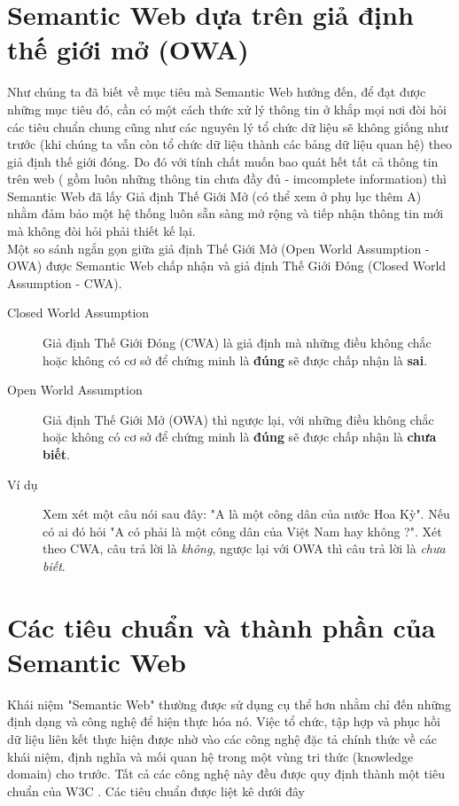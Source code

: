\section{Semantic Web dựa trên giả định thế giới mở (OWA)} 
Như chúng ta đã biết về mục tiêu mà Semantic Web hướng đến, để đạt được những mục tiêu đó, cần có một cách thức xử lý thông tin ở khắp mọi nơi đòi hỏi các tiêu chuẩn chung cũng như các nguyên lý tổ chức dữ liệu sẽ không giống như trước (khi chúng ta vẫn còn tổ chức dữ liệu thành các bảng dữ liệu quan hệ) theo giả định thế giới đóng. Do đó với tính chất muốn bao quát hết tất cả thông tin trên web ( gồm luôn những thông tin chưa đầy đủ - imcomplete information) thì Semantic Web đã lấy Giả định Thế Giới Mở (có thể xem ở phụ lục thêm A) nhằm đảm bảo một hệ thống luôn sẵn sàng mở rộng và tiếp nhận thông tin mới mà không đòi hỏi phải thiết kế lại.
\\
Một so sánh ngắn gọn giữa giả định Thế Giới Mở (Open World Assumption - OWA)\cite{OWA_0} được Semantic Web chấp nhận và giả định Thế Giới Đóng (Closed World Assumption - CWA).
\begin{description}
	\item[Closed World Assumption] 
	Giả định Thế Giới Đóng (CWA) là giả định mà những điều không chắc hoặc không có cơ sở để chứng minh là \textbf{đúng} sẽ được chấp nhận là \textbf{sai}.
	\item[Open World Assumption]
	Giả định Thế Giới Mở (OWA) thì ngược lại, với những điều không chắc hoặc không có cơ sở để chứng minh là \textbf{đúng} sẽ được chấp nhận là \textbf{chưa biết}. 
	\item[Ví dụ]
	Xem xét một câu nói sau đây: "A là một công dân của nước Hoa Kỳ". Nếu có ai đó hỏi "A có phải là một công dân của Việt Nam hay không ?". Xét theo CWA, câu trả lời là \textit{không}, ngược lại với OWA thì câu trả lời là \textit{chưa biết}. 
\end{description}
\section{Các tiêu chuẩn và thành phần của Semantic Web}
Khái niệm "Semantic Web" thường được sử dụng cụ thể hơn nhằm chỉ đến những định dạng và công nghệ để hiện thực hóa nó. Việc tổ chức, tập hợp và phục hồi dữ liệu liên kết thực hiện được nhờ vào các công nghệ đặc tả chính thức về các khái niệm, định nghĩa và mối quan hệ trong một vùng tri thức (knowledge domain) cho trước. Tất cả các công nghệ này đều được quy định thành một tiêu chuẩn của W3C \cite{semantic2}. Các tiêu chuẩn được liệt kê dưới đây

